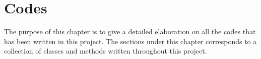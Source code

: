 \chapter{Codes}
The purpose of this chapter is to give a detailed elaboration on all the codes that has been written in this project. The sections under this chapter corresponds to a collection of classes and methods written throughout this project.


